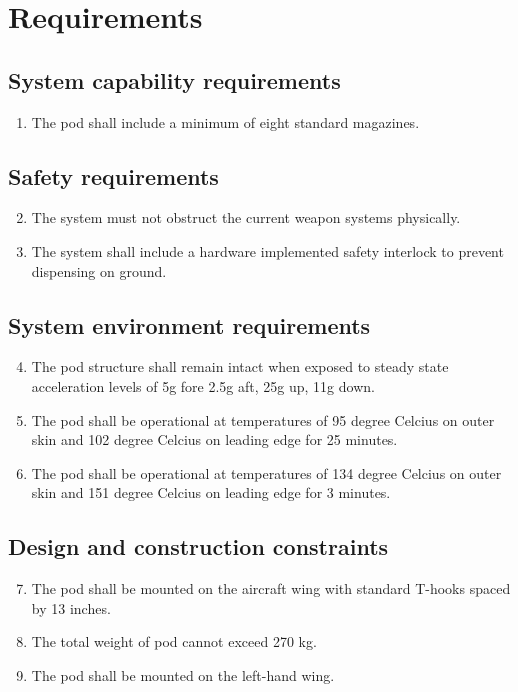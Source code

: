 \documentclass[Main]{subfiles}
\begin{document}
\setcounter{chapter}{2}
\chapter{Requirements}

\section{System capability requirements}
\begin{enumerate}[{SR}-1]
\setcounter{enumi}{0}
\item The pod shall include a minimum of eight standard magazines.

\end{enumerate}

\section{Safety requirements}
\begin{enumerate}[{SR}-1.]
\setcounter{enumi}{1}
\item The system must not obstruct the current weapon systems physically.

\item The system shall include a hardware implemented safety interlock to prevent dispensing on ground.

\end{enumerate}

\section{System environment requirements}

\begin{enumerate}[{SR}-1]
\setcounter{enumi}{3}
\item The pod structure shall remain intact when exposed to steady state acceleration levels of 5g fore 2.5g aft, 25g up, 11g down.

\item The pod shall be operational at temperatures of 95 degree Celcius on outer skin and 102 degree Celcius on leading edge for 25 minutes.

\item The pod shall be operational at temperatures of 134 degree Celcius on outer skin and 151 degree Celcius on leading edge for 3 minutes.

\end{enumerate}

\section{Design and construction constraints}

\begin{enumerate}[{SR}-1]
\setcounter{enumi}{6}
\item The pod shall be mounted on the aircraft wing with standard T-hooks spaced by 13 inches.

\item The total weight of pod cannot exceed 270 kg.

\item The pod shall be mounted on the left-hand wing.

\end{enumerate}
\end{document}
